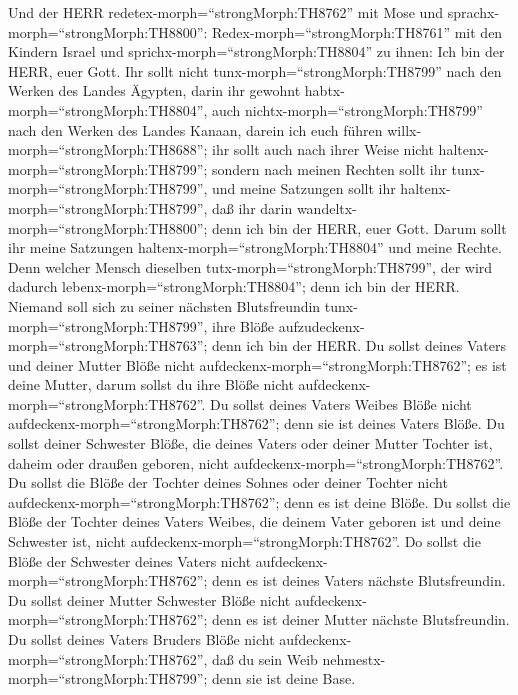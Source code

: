 Und der HERR redetex-morph=``strongMorph:TH8762'' mit Mose
und sprachx-morph=``strongMorph:TH8800'': 
Redex-morph=``strongMorph:TH8761'' mit den Kindern Israel und
sprichx-morph=``strongMorph:TH8804'' zu ihnen: Ich bin der HERR, euer
Gott.  Ihr sollt nicht tunx-morph=``strongMorph:TH8799''
nach den Werken des Landes Ägypten, darin ihr gewohnt
habtx-morph=``strongMorph:TH8804'', auch
nichtx-morph=``strongMorph:TH8799'' nach den Werken des Landes Kanaan,
darein ich euch führen willx-morph=``strongMorph:TH8688''; ihr sollt
auch nach ihrer Weise nicht haltenx-morph=``strongMorph:TH8799'';
 sondern nach meinen Rechten sollt ihr
tunx-morph=``strongMorph:TH8799'', und meine Satzungen sollt ihr
haltenx-morph=``strongMorph:TH8799'', daß ihr darin
wandeltx-morph=``strongMorph:TH8800''; denn ich bin der HERR, euer Gott.
 Darum sollt ihr meine Satzungen
haltenx-morph=``strongMorph:TH8804'' und meine Rechte. Denn welcher
Mensch dieselben tutx-morph=``strongMorph:TH8799'', der wird dadurch
lebenx-morph=``strongMorph:TH8804''; denn ich bin der HERR. 
Niemand soll sich zu seiner nächsten Blutsfreundin
tunx-morph=``strongMorph:TH8799'', ihre Blöße
aufzudeckenx-morph=``strongMorph:TH8763''; denn ich bin der HERR.
 Du sollst deines Vaters und deiner Mutter Blöße nicht
aufdeckenx-morph=``strongMorph:TH8762''; es ist deine Mutter, darum
sollst du ihre Blöße nicht aufdeckenx-morph=``strongMorph:TH8762''.
 Du sollst deines Vaters Weibes Blöße nicht
aufdeckenx-morph=``strongMorph:TH8762''; denn sie ist deines Vaters
Blöße.  Du sollst deiner Schwester Blöße, die deines Vaters
oder deiner Mutter Tochter ist, daheim oder draußen geboren, nicht
aufdeckenx-morph=``strongMorph:TH8762''.  Du sollst die
Blöße der Tochter deines Sohnes oder deiner Tochter nicht
aufdeckenx-morph=``strongMorph:TH8762''; denn es ist deine Blöße.
 Du sollst die Blöße der Tochter deines Vaters Weibes, die
deinem Vater geboren ist und deine Schwester ist, nicht
aufdeckenx-morph=``strongMorph:TH8762''.  Do sollst die
Blöße der Schwester deines Vaters nicht
aufdeckenx-morph=``strongMorph:TH8762''; denn es ist deines Vaters
nächste Blutsfreundin.  Du sollst deiner Mutter Schwester
Blöße nicht aufdeckenx-morph=``strongMorph:TH8762''; denn es ist deiner
Mutter nächste Blutsfreundin.  Du sollst deines Vaters
Bruders Blöße nicht aufdeckenx-morph=``strongMorph:TH8762'', daß du sein
Weib nehmestx-morph=``strongMorph:TH8799''; denn sie ist deine Base.
